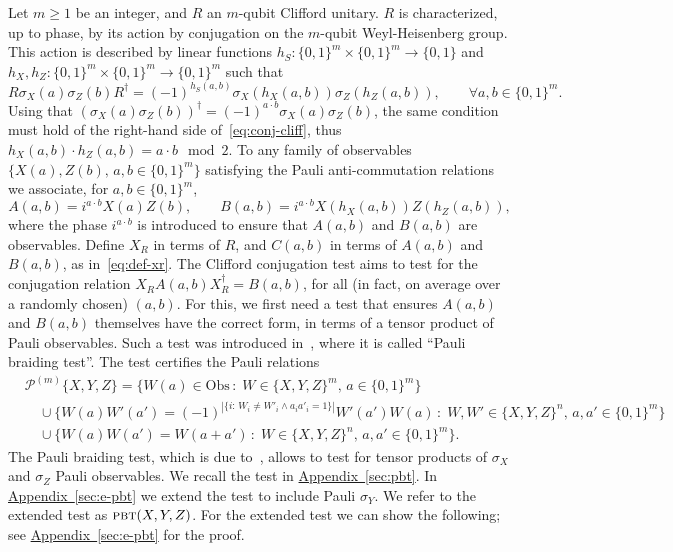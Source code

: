 \documentclass[11pt]{article}
\numberwithin{equation}{section}
\theoremstyle{definition}
\theoremstyle{plain}
\newcommand{\expref}[2]{\hyperref[#2]{#1~\ref{#2}}}
\newcommand{\setft}[1]{\mathrm{#1}}
\newcommand{\Obs}{\setft{Obs}}
\newcommand{\pbt}{\textsc{pbt}}
\newcommand{\paulin}{\mathcal{P}^{(m)}\!}
\begin{document}
Let $m\geq 1$ be an integer, and $R$ an $m$-qubit Clifford unitary. $R$ is characterized, up to phase, by its action by conjugation on the $m$-qubit Weyl-Heisenberg group. This action is described  by linear functions $h_S:\{0,1\}^m\times\{0,1\}^m \to \{0,1\}$ and $h_X,h_Z:\{0,1\}^m\times\{0,1\}^m \to \{0,1\}^m$ such that
\begin{equation}\label{eq:conj-cliff}
R \sigma_X(a)\sigma_Z(b) R^\dagger = (-1)^{h_S(a,b)}\sigma_X(h_X(a,b))\sigma_Z(h_Z(a,b)),\qquad\forall a,b\in\{0,1\}^m.
\end{equation}
Using that $(\sigma_X(a)\sigma_Z(b))^\dagger = (-1)^{a\cdot b} \sigma_X(a)\sigma_Z(b)$, the same condition must hold of the right-hand side of~\eqref{eq:conj-cliff}, thus $h_X(a,b)\cdot h_Z(a,b) = a\cdot b\mod 2$. 
 To any family of observables $\{X(a),Z(b),\,a,b\in\{0,1\}^m\}$ satisfying the Pauli anti-commutation relations we associate,  for $a,b\in\{0,1\}^m$,
\begin{equation}\label{eq:def-control-c}
A(a,b) = i^{a\cdot b}X(a)Z(b), \qquad B(a,b) = i^{a\cdot b}X(h_X(a,b))Z(h_Z(a,b)),
\end{equation}
where the phase $i^{a\cdot b}$ is introduced to ensure that $A(a,b)$ and $B(a,b)$ are observables. Define $X_R$ in terms of $R$, and $C(a,b)$ in terms of $A(a,b)$ and $B(a,b)$, as in~\eqref{eq:def-xr}. 
The Clifford conjugation test aims to test for the conjugation relation $X_RA(a,b)X_R^\dagger = B(a,b)$, for all (in fact, on average over a randomly chosen) $(a,b)$. For this, we first need a test that ensures $A(a,b)$ and $B(a,b)$ themselves have the correct form, in terms of a tensor product of Pauli observables. Such a test was introduced in~\cite{natarajan2016robust}, where it is called ``Pauli braiding test''. The test certifies the Pauli relations 
\begin{align*}
& {\paulin}\{X,Y,Z\} = \Big\{ W(a)\in\Obs\,:\;W \in \{X,Y,Z\}^m,\,a\in\{0,1\}^m\Big\} \\
&\quad\cup \Big\{W(a)W'(a')=(-1)^{|\{i:\,W_i\neq W'_i \wedge a_ia'_i=1\}|} W'(a')W(a)\,:\; W,W' \in \{X,Y,Z\}^n,\, a,a'\in\{0,1\}^m\Big\}\\
&\quad \cup\Big\{ W(a)W(a')=W(a+a')\,:\;W\in\{X,Y,Z\}^n,\, a,a'\in\{0,1\}^m\Big\}.
\end{align*}
The Pauli braiding test, which is due to~\cite{natarajan2016robust}, allows to test for tensor products of $\sigma_X$ and $\sigma_Z$ Pauli observables. We recall the test in \expref{Appendix}{sec:pbt}. In \expref{Appendix}{sec:e-pbt} we extend the test to include Pauli $\sigma_Y$. We refer to the extended test as $\pbt(X,Y,Z)$. For the extended test we can show the following; see \expref{Appendix}{sec:e-pbt} for the proof.
\end{document}
